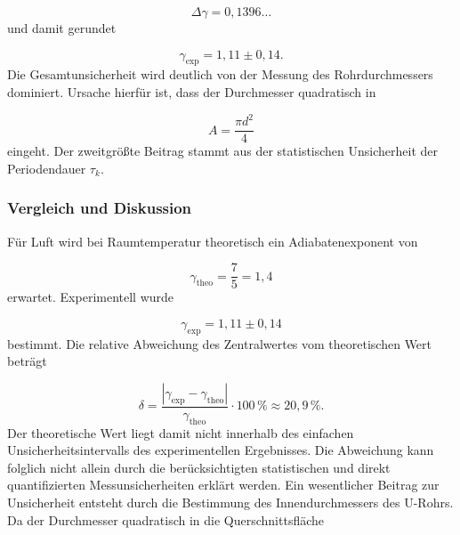 \documentclass{report}
\begin{document}
\begin{equation}
\Delta\gamma
=
0{,}1396\ldots
\end{equation}
\noindent
und damit gerundet

\begin{equation}
\boxed{
\gamma_\mathrm{exp}=1{,}11\pm0{,}14
}.
\end{equation}
\noindent
Die Gesamtunsicherheit wird deutlich von der Messung des Rohrdurchmessers
dominiert. Ursache hierfür ist, dass der Durchmesser quadratisch in

\begin{equation}
A=\frac{\pi d^2}{4}
\end{equation}
\noindent
eingeht. Der zweitgrößte Beitrag stammt aus der statistischen Unsicherheit der
Periodendauer $\tau_k$.


\subsubsection{Vergleich und Diskussion}
\noindent
Für Luft wird bei Raumtemperatur theoretisch ein Adiabatenexponent von

\begin{equation}
\gamma_\mathrm{theo}
=
\frac{7}{5}
=
1{,}4
\end{equation}
\noindent
erwartet.
\noindent
Experimentell wurde

\begin{equation}
\boxed{
\gamma_\mathrm{exp}
=
1{,}11\pm0{,}14
}
\end{equation}
\noindent
bestimmt. Die relative Abweichung des Zentralwertes vom theoretischen Wert beträgt

\begin{equation}
\delta
=
\frac{
|\gamma_\mathrm{exp}-\gamma_\mathrm{theo}|
}{
\gamma_\mathrm{theo}
}
\cdot100\,\%
\approx
20{,}9\,\%.
\end{equation}
\noindent
Der theoretische Wert liegt damit nicht innerhalb des einfachen
Unsicherheitsintervalls des experimentellen Ergebnisses. Die Abweichung kann
folglich nicht allein durch die berücksichtigten statistischen und direkt
quantifizierten Messunsicherheiten erklärt werden.
\noindent
Ein wesentlicher Beitrag zur Unsicherheit entsteht durch die Bestimmung des
Innendurchmessers des U-Rohrs. Da der Durchmesser quadratisch in die
Querschnittsfläche
\end{document}
